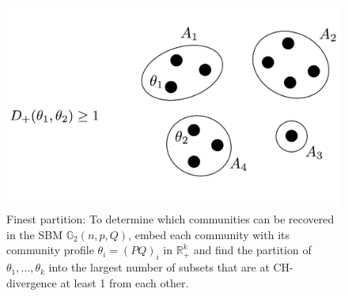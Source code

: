 \documentclass[11pt]{article}
\newcommand{\gs}{\mathbb{G}_2}
\newcommand{\dd}{D_+}
\newcommand{\mR}{\mathbb{R}}
\newcommand{\X}{\mathcal{X}}
\newcommand{\1}{\mathbb{1}}
\newtheorem{definition}{Definition}
\begin{document}
\begin{figure}[h]
\centering
  \includegraphics[width=.5\linewidth]{H-embedding2.png}
  \caption{Finest partition: To determine which communities can be recovered in the SBM $\gs(n,p,Q)$, embed each community with its community profile $\theta_i=(PQ)_i$ in $\mR_+^k$ and find the partition of $\theta_1,\dots,\theta_k$ into the largest number of subsets that are at CH-divergence at least 1 from each other.}
  \label{finest-partition}
\end{figure}



\end{document}
